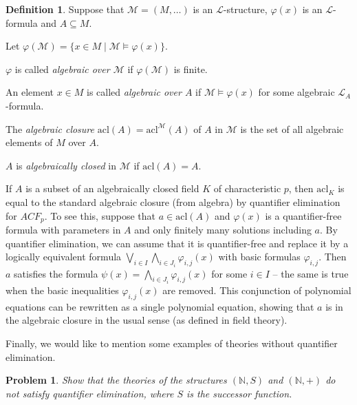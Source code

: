 \documentclass[10pt]{amsart}
\renewcommand{\L}{\mathcal{L}}
\newcommand{\M}{\mathcal{M}}
\newcommand{\NNN}{\mathbb{N}}
\newcommand{\MM}{\mathcal{M}}
\newcommand{\acl}{\mathrm{acl}}
\newtheorem{problem}[theorem]{Problem}
\theoremstyle{definition}
\newtheorem{definition}[theorem]{Definition}
\theoremstyle{remark}
\newenvironment{enumerate-(a)}{\begin{enumerate}[label={\upshape (\alph*)}, leftmargin=2pc]}{\end{enumerate}}
\begin{document}
\begin{definition} 
Suppose that $\MM=(M,\dots)$ is an $\L$-structure, $\varphi(x)$ is an $\L$-formula and $A\subseteq M$. 
\begin{enumerate-(a)} 
\item 
Let $\varphi(\M)=\{x\in M\mid\MM\models \varphi(x)\}$. 
\item 
$\varphi$ is called \emph{algebraic over $\MM$} if $\varphi(\MM)$ is finite. 
\item 
An element $x\in M$ is called \emph{algebraic over $A$} if $\MM\models \varphi(x)$ for some algebraic $\L_A$-formula. 
\item 
The \emph{algebraic closure} $\acl(A)=\acl^\MM(A)$ of $A$ in $\MM$ is the set of all algebraic elements of $M$ over $A$. 
\item 
$A$ is \emph{algebraically closed} in $\MM$ if $\acl(A)=A$. 
\end{enumerate-(a)} 
\end{definition} 

If $A$ is a subset of an algebraically closed field $K$ of characteristic $p$, then $\acl_K$ is equal to the standard algebraic closure (from algebra) by quantifier elimination for $ACF_p$. To see this, suppose that $a\in\acl(A)$ and $\varphi(x)$ is a quantifier-free formula with parameters in $A$ and only finitely many solutions including $a$. By quantifier elimination, we can assume that it is quantifier-free and replace it by a logically equivalent formula $\bigvee_{i\in I} \bigwedge_{i\in J_i} \varphi_{i,j}(x)$ with basic formulas $\varphi_{i,j}$. Then $a$ satisfies the formula $\psi(x)=\bigwedge_{i\in J_i} \varphi_{i,j}(x)$ for some $i\in I$ -- the same is true when the basic inequalities $\varphi_{i,j}(x)$ are removed. This conjunction of polynomial equations can be rewritten as a single polynomial equation, showing that $a$ is in the algebraic closure in the usual sense (as defined in field theory). 


Finally, we would like to mention some examples of theories without quantifier elimination. 

\begin{problem} 
Show that the theories of the structures $(\NNN, S)$ and $(\NNN, +)$ do not satisfy quantifier elimination, where $S$ is the successor function. 
\end{problem} 
\end{document}
